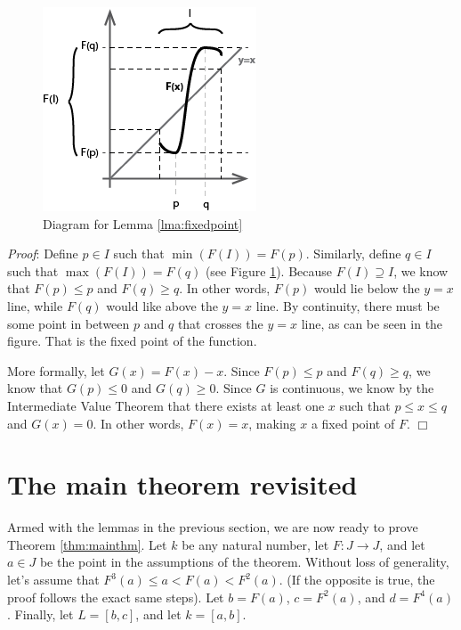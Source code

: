 \documentclass[12pt]{IEEEtran}
\begin{document}
\begin{figure}
	\begin{center}
		\includegraphics{img/fixedpoint_graph.png}
		\caption{Diagram for Lemma \ref{lma:fixedpoint}}
        \label{fig:fixedpoint_graph}
	\end{center}
\end{figure}

{\it Proof}: Define $p \in I$ such that $\min \left( F \left( I \right) \right) = F \left( p \right)$. Similarly, define $q \in I$ such that $\max \left( F \left( I \right) \right) = F \left( q \right)$ (see Figure \ref{fig:fixedpoint_graph}). Because $F \left( I \right) \supseteq I$, we know that $F \left( p \right) \leq p$ and $F \left( q \right) \geq q$. In other words, $F \left( p \right)$ would lie below the $y=x$ line, while $F \left( q \right)$ would like above the $y=x$ line. By continuity, there must be some point in between $p$ and $q$ that crosses the $y=x$ line, as can be seen in the figure. That is the fixed point of the function.

More formally, let $G \left( x \right) = F \left( x \right) - x$. Since $F \left( p \right) \leq p$ and $F \left( q \right) \geq q$, we know that $G \left( p \right) \leq 0$ and $G \left( q \right) \geq 0$. Since $G$ is continuous, we know by the Intermediate Value Theorem that there exists at least one $x$ such that $p \leq x \leq q$ and $G \left( x \right) = 0$. In other words, $F \left(x \right) = x$, making $x$ a fixed point of $F$. $\Box$



\section{The main theorem revisited}

Armed with the lemmas in the previous section, we are now ready to prove Theorem \ref{thm:mainthm}. Let $k$ be any natural number, let $F : J \rightarrow J$, and let $a \in J$ be the point in the assumptions of the theorem. Without loss of generality, let's assume that $F^3\left(a\right) \leq a < F\left(a\right) < F^2\left(a\right)$. (If the opposite is true, the proof follows the exact same steps). Let $b = F \left( a \right)$, $c = F ^2 \left( a \right)$, and $d = F^4  \left( a \right)$. Finally, let $L = \left[ b, c \right]$, and let $k = \left[ a,b \right]$.
\end{document}
